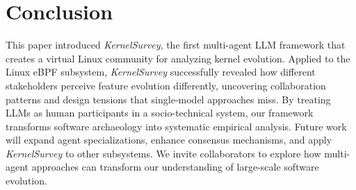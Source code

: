 \documentclass[sigconf,review,anonymous]{acmart}
\newcommand{\sys}{\textit{KernelSurvey}\xspace}
\begin{document}





\section{Conclusion}

This paper introduced \sys, the first multi-agent LLM framework that creates a virtual Linux community for analyzing kernel evolution. Applied to the Linux eBPF subsystem, \sys successfully revealed how different stakeholders perceive feature evolution differently, uncovering collaboration patterns and design tensions that single-model approaches miss. By treating LLMs as human participants in a socio-technical system, our framework transforms software archaeology into systematic empirical analysis. Future work will expand agent specializations, enhance consensus mechanisms, and apply \sys to other subsystems. We invite collaborators to explore how multi-agent approaches can transform our understanding of large-scale software evolution.


    
\end{document}
